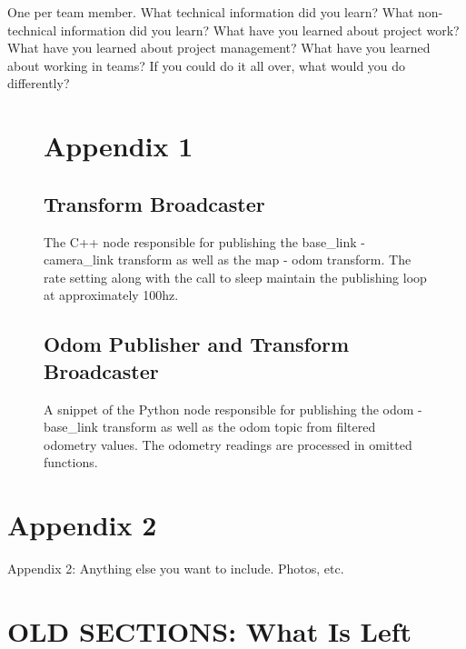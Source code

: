 \documentclass[10pt, oneside,onecolumn]{IEEEtran}
\begin{document}
One per team member.
What technical information did you learn?
What non-technical information did you learn?
What have you learned about project work?
What have you learned about project management?
What have you learned about working in teams?
If you could do it all over, what would you do differently?

\begin{figure}[p!]
\section{Appendix 1}
\subsection{Transform Broadcaster}

\centering
\caption{The C++ node responsible for publishing the base\_link - camera\_link transform as well as the map - odom transform. The rate setting along with the call to sleep maintain the publishing loop at approximately 100hz.}
\end{figure}

\begin{figure}[p!]
\subsection{Odom Publisher and Transform Broadcaster}

\centering
\caption{A snippet of the Python node responsible for publishing the odom - base\_link transform as well as the \/odom topic from filtered odometry values. The odometry readings are processed in omitted functions.}
\end{figure}

\section{Appendix 2}

Appendix 2: Anything else you want to include. Photos, etc.



















\section{OLD SECTIONS: What Is Left}
\end{document}
